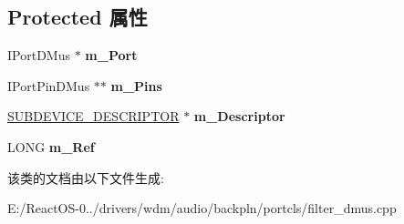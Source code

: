 \subsection*{Protected 属性}
\begin{DoxyCompactItemize}
\item 
\mbox{\label{class_c_port_filter_d_mus_a2f05e70168633b2553b27abc51b7f334}} 
I\+Port\+D\+Mus $\ast$ {\bfseries m\+\_\+\+Port}
\item 
\mbox{\label{class_c_port_filter_d_mus_abb4ca21de7e7d10541149282b88e068d}} 
I\+Port\+Pin\+D\+Mus $\ast$$\ast$ {\bfseries m\+\_\+\+Pins}
\item 
\mbox{\label{class_c_port_filter_d_mus_adb25907d804a6cf186f25da2daa79c90}} 
\hyperlink{struct_s_u_b_d_e_v_i_c_e___d_e_s_c_r_i_p_t_o_r}{S\+U\+B\+D\+E\+V\+I\+C\+E\+\_\+\+D\+E\+S\+C\+R\+I\+P\+T\+OR} $\ast$ {\bfseries m\+\_\+\+Descriptor}
\item 
\mbox{\label{class_c_port_filter_d_mus_a1dad4a3fa5c9bb1ca152267cb5f859ec}} 
L\+O\+NG {\bfseries m\+\_\+\+Ref}
\end{DoxyCompactItemize}


该类的文档由以下文件生成\+:\begin{DoxyCompactItemize}
\item 
E\+:/\+React\+O\+S-\/0../drivers/wdm/audio/backpln/portcls/filter\+\_\+dmus.\+cpp\end{DoxyCompactItemize}
